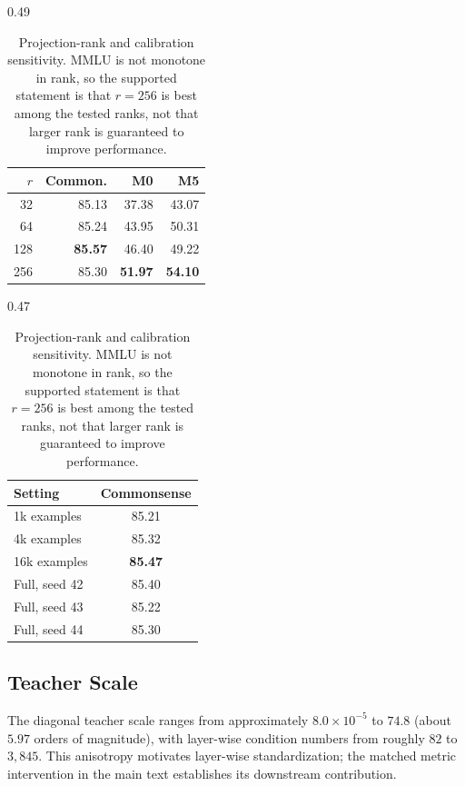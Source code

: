 \documentclass{article}
\theoremstyle{plain}
\theoremstyle{definition}
\theoremstyle{remark}
\begin{document}
\begin{table}[H]
\centering
\begin{subtable}[t]{0.49\linewidth}
\centering\footnotesize
\caption{Projection rank}
\label{tab:app-projection-rank}
\setlength{\tabcolsep}{4pt}
\begin{tabular}{@{}rrrr@{}}
\toprule
$r$ & \textbf{Common.} & \textbf{M0} & \textbf{M5}\\
\midrule
32 & 85.13 & 37.38 & 43.07\\
64 & 85.24 & 43.95 & 50.31\\
128 & \textbf{85.57} & 46.40 & 49.22\\
256 & 85.30 & \textbf{51.97} & \textbf{54.10}\\
\bottomrule
\end{tabular}
\end{subtable}\hfill
\begin{subtable}[t]{0.47\linewidth}
\centering\footnotesize
\caption{Geometry calibration}
\label{tab:app-calibration}
\setlength{\tabcolsep}{5pt}
\begin{tabular}{@{}lc@{}}
\toprule
\textbf{Setting} & \textbf{Commonsense}\\
\midrule
1k examples & 85.21\\
4k examples & 85.32\\
16k examples & \textbf{85.47}\\
Full, seed 42 & 85.40\\
Full, seed 43 & 85.22\\
Full, seed 44 & 85.30\\
\bottomrule
\end{tabular}
\end{subtable}
\caption{Projection-rank and calibration sensitivity.  MMLU is not monotone in
rank, so the supported statement is that $r=256$ is best among the tested ranks,
not that larger rank is guaranteed to improve performance.}
\label{tab:app-rank-calibration}
\end{table}

\subsection{Teacher Scale}

The diagonal teacher scale ranges from approximately $8.0\times10^{-5}$ to $74.8$
(about $5.97$ orders of magnitude), with layer-wise condition numbers from roughly
$82$ to $3{,}845$.  This anisotropy motivates layer-wise standardization; the
matched metric intervention in the main text establishes its downstream
contribution.
\end{document}
